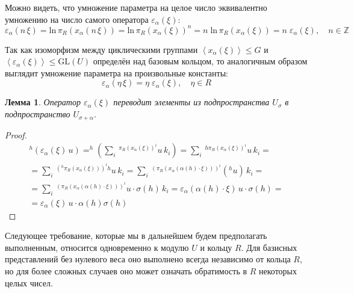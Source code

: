 \documentclass[12pt]{matmex-diploma}
\theoremstyle{mystyleni}
\theoremstyle{mystyle}
\newtheorem{lm}{Лемма}
\newcommand{\Z}{\mathbb{Z}}
\renewcommand{\le}{\leqslant}
\begin{document}
Можно видеть, что умножение параметра на целое число эквивалентно умножению на число самого оператора $\varepsilon_\alpha(\xi)$:
$$ \varepsilon_\alpha(n \, \xi) = \mathrm{ln} \, \pi_R(x_\alpha(n \, \xi)) = \mathrm{ln} \, \pi_R(x_\alpha(\xi))^n = n \; \mathrm{ln} \, \pi_R(x_\alpha(\xi)) = n \; \varepsilon_\alpha(\xi), \quad n \in \Z
$$

Так как изоморфизм  между циклическими группами $\left<x_\alpha(\xi)\right> \le G$ и $\left<\varepsilon_\alpha(\xi)\right> \le \mathrm{GL}(U)$ определён над базовым кольцом, то аналогичным образом выглядит умножение параметра на произвольные константы:
$$
\varepsilon_\alpha(\eta \, \xi) = \eta \; \varepsilon_\alpha(\xi), \quad \eta \in R
$$

\begin{lm}
Оператор $\varepsilon_\alpha(\xi)$ переводит элементы из подпространства $U_\sigma$ в подпространство $U_{\sigma+\alpha}$.
\end{lm}
\begin{proof}
\begin{multline*}
^h(\varepsilon_\alpha(\xi) \, u) =
^h\left(\sum_i \, {^{\pi_R(x_\alpha(\xi))^i}u \, k_i}\right) = 
\sum_i \, {^{h \pi_R(x_\alpha(\xi))^i}u \, k_i} = \\ =
\sum_i \, {^{(^h \pi_R(x_\alpha(\xi)))^i h}u \, k_i} = 
\sum_i \, {^{(\pi_R(x_\alpha(\alpha(h)\cdot\xi)))^i} \left(^h u\right) \, k_i} =\\=
\sum_i \, {^{(\pi_R(x_\alpha(\alpha(h)\cdot\xi)))^i} u \cdot \sigma(h) \, k_i} =
\varepsilon_\alpha(\alpha(h)\cdot\xi) \, u \cdot \sigma(h) = \\ =
\varepsilon_\alpha(\xi) \, u \cdot \alpha(h)\sigma(h)
\end{multline*}
\end{proof}

Следующее требование, которые мы в дальнейшем будем предполагать выполненным, относится одновременно к модулю $U$ и кольцу $R$. Для базисных представлений без нулевого веса оно выполнено всегда независимо от кольца $R$, но для более сложных случаев оно может означать обратимость в $R$ некоторых целых чисел.
\end{document}
